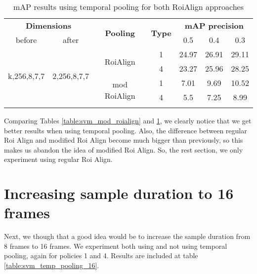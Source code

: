 \begin{center}
\begin{longtable}{||c | c| c| c||c c c||}

  \hline
 \multicolumn{2}{||c|}{\textbf{Dimensions}} & \multirow{2}{*}{\textbf{Pooling}} &\multirow{2}{*}{ \textbf{Type}} &\multicolumn{3}{|c||}{\textbf{mAP precision}}\\

  before & after & {} & {} & 0.5 &  0.4 & 0.3\\
  \hline   \hline

  \multirow{4}{*}{k,256,8,7,7} & \multirow{4}{*}{2,256,8,7,7} & \multirow{2}{*}{RoiAlign}  & 1 & 24.97 & 26.91 & 29.11 \\
  \cline{4-7}
  {} & {} & {} & 4 &  23.27 & 25.96 & 28.25 \\
  \cline{3-7}
  {} & {} & \multirow{2}{*}{mod RoiAlign} & 1 & 7.01 & 9.69 & 10.52 \\
  \cline{4-7}
  {} & {} & {} & 4 & 5.5 & 7.25 & 8.99 \\
  \hline

  \caption{mAP results using temporal pooling for both RoiAlign approaches}
  \label{table:svm_temp_pooling}
\end{longtable} 
\end{center}

Comparing Tables \ref{table:svm_mod_roialign} and \ref{table:svm_temp_pooling}, we clearly notice that we get better results when
using temporal pooling. Also, the difference between regular Roi Align and modified Roi Align become much bigger than previously,
so this makes us abandon the idea of modified Roi Align. So, the rest section, we only experiment using regular Roi Align.

\section{Increasing sample duration to 16 frames}

Next, we though that a good idea would be to increase the sample duration from 8 frames to 16 frames. We experiment both using and not
using temporal pooling, again for policies 1 and 4. Results are included at table \ref{table:svm_temp_pooling_16}. 

